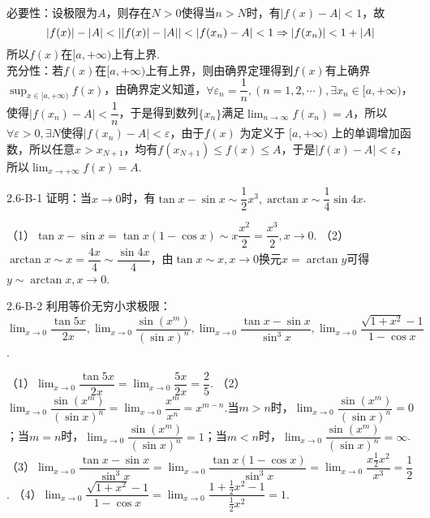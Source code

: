\begin{solution}
    必要性：设极限为$A$，则存在$N>0$使得当$n>N$时，有$|f(x)-A|<1$，故\vspace{-10pt}
    \[|f(x)|-|A|<||f(x)|-|A||<|f(x_n)-A|<1\Rightarrow |f(x_n)|<1+|A|\vspace{-10pt}\]
    所以$f(x)$在$[a, +\infty)$上有上界.\\
    充分性：若$f(x)$在$[a, +\infty)$上有上界，则由确界定理得到$f(x)$有上确界$\sup_{x\in[a, +\infty)}f(x)$，由确界定义知道，$\forall \varepsilon_n=\dfrac1{n},(n=1,2,\cdots),\exists x_n\in[a,+\infty)$，使得$|f(x_n)-A|<\dfrac1{n}$，于是得到数列$\{x_n\}$满足$\displaystyle\lim_{n\to\infty}f(x_n)=A$，所以$\forall \varepsilon>0,\exists N$使得$|f(x_n)-A|<\varepsilon$，由于$f(x)$ 为定义于 $[a, +\infty)$ 上的单调增加函数，所以任意$x>x_{N+1}$，均有$f(x_{N+1})\leq f(x)\leq A$，于是$|f(x)-A|<\varepsilon$，所以$\displaystyle\lim_{x\to+\infty}f(x)=A$.
\end{solution}
\begin{example}{2.6-B-1}{}
    证明：当$x\to 0$时，有$\tan x-\sin x\sim \dfrac12x^3,\arctan x\sim \dfrac14\sin 4x$.
\end{example}
\begin{solution}
（1）$\tan x-\sin x=\tan x(1-\cos x)\sim x\dfrac{x^2}{2}=\dfrac{x^3}{2},x\to 0$.
（2）$\arctan x\sim x=\dfrac{4x}{4}\sim\dfrac{\sin 4x}{4}$，由$\tan x\sim x,x\to 0$换元$x=\arctan y$可得$y\sim\arctan x,x\to 0$.
\end{solution}
\begin{example}{2.6-B-2}{}
    利用等价无穷小求极限：$\displaystyle \lim_{x\to 0}\dfrac{\tan 5x}{2x},\lim_{x\to 0}\dfrac{\sin(x^m)}{(\sin x)^n},\lim_{x\to 0}\dfrac{\tan x-\sin x}{\sin^3 x},\lim_{x\to 0}\dfrac{\sqrt{1+x^2}-1}{1-\cos x}$.
\end{example}
\begin{solution}
    （1）$\displaystyle \lim_{x\to 0}\dfrac{\tan 5x}{2x}=\lim_{x\to 0}\dfrac{5x}{2x}=\dfrac25$.
    （2）$\displaystyle \lim_{x\to 0}\dfrac{\sin(x^m)}{(\sin x)^n}=\lim_{x\to 0}\dfrac{x^m}{x^n}=x^{m-n}$.当$m>n$时，$\lim_{x\to 0}\dfrac{\sin(x^m)}{(\sin x)^n}=0$；当$m=n$时，$\lim_{x\to 0}\dfrac{\sin(x^m)}{(\sin x)^n}=1$；当$m<n$时，$\lim_{x\to 0}\dfrac{\sin(x^m)}{(\sin x)^n}=\infty$.
    （3）$\displaystyle \lim_{x\to 0}\dfrac{\tan x-\sin x}{\sin^3 x}=\lim_{x\to 0}\dfrac{\tan x(1-\cos x)}{\sin^3x}=\lim_{x\to 0}\dfrac{x\frac12x^2}{x^3}=\dfrac12$.
    （4）$\displaystyle \lim_{x\to 0}\dfrac{\sqrt{1+x^2}-1}{1-\cos x}=\lim_{x\to 0}\dfrac{1+\frac12x^2-1}{\frac12x^2}=1$.
\end{solution}
